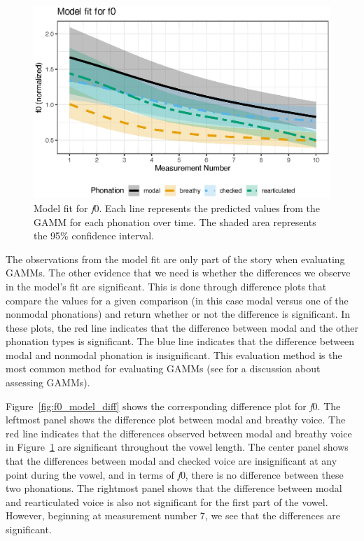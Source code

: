 \begin{figure}[h!]
    \centering
    \includegraphics[width = \linewidth]{images/LCH_GAMMs/f0_model_fit.eps}
    \caption{Model fit for \textit{f}0. Each line represents the predicted values from the GAMM for each phonation over time. The shaded area represents the 95\% confidence interval.}
    \label{fig:f0_model_fit}
\end{figure}

The observations from the model fit are only part of the story when evaluating GAMMs. The other evidence that we need is whether the differences we observe in the model's fit are significant. This is done through difference plots that compare the values for a given comparison (in this case modal versus one of the nonmodal phonations) and return whether or not the difference is significant. In these plots, the red line indicates that the difference between modal and the other phonation types is significant. The blue line indicates that the difference between modal and nonmodal phonation is insignificant. This evaluation method is the most common method for evaluating GAMMs (see \cite{soskuthyEvaluatingGeneralisedAdditive2021} for a discussion about assessing GAMMs). 

Figure~\ref{fig:f0_model_diff} shows the corresponding difference plot for \textit{f}0. The leftmost panel shows the difference plot between modal and breathy voice. The red line indicates that the differences observed between modal and breathy voice in Figure~\ref{fig:f0_model_fit} are significant throughout the vowel length. The center panel shows that the differences between modal and checked voice are insignificant at any point during the vowel, and in terms of \textit{f}0, there is no difference between these two phonations. The rightmost panel shows that the difference between modal and rearticulated voice is also not significant for the first part of the vowel. However, beginning at measurement number 7, we see that the differences are significant.


